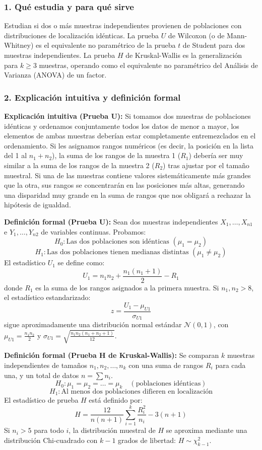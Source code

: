 \documentclass[11pt,a4paper]{article}
\begin{document}
\subsubsection{1. Qué estudia y para qué sirve}
Estudian si dos o más muestras independientes provienen de poblaciones con distribuciones de localización idénticas. La prueba $U$ de Wilcoxon (o de Mann-Whitney) es el equivalente no paramétrico de la prueba $t$ de Student para dos muestras independientes. La prueba $H$ de Kruskal-Wallis es la generalización para $k \ge 3$ muestras, operando como el equivalente no paramétrico del Análisis de Varianza (ANOVA) de un factor.

\subsubsection{2. Explicación intuitiva y definición formal}
\textbf{Explicación intuitiva (Prueba U):} Si tomamos dos muestras de poblaciones idénticas y ordenamos conjuntamente todos los datos de menor a mayor, los elementos de ambas muestras deberían estar completamente entremezclados en el ordenamiento. Si les asignamos rangos numéricos (es decir, la posición en la lista del 1 al $n_1+n_2$), la suma de los rangos de la muestra 1 ($R_1$) debería ser muy similar a la suma de los rangos de la muestra 2 ($R_2$) tras ajustar por el tamaño muestral. Si una de las muestras contiene valores sistemáticamente más grandes que la otra, sus rangos se concentrarán en las posiciones más altas, generando una disparidad muy grande en la suma de rangos que nos obligará a rechazar la hipótesis de igualdad.

\textbf{Definición formal (Prueba U):} Sean dos muestras independientes $X_1, \dots, X_{n1}$ e $Y_1, \dots, Y_{n2}$ de variables continuas. Probamos:
\[ H_0: \text{Las dos poblaciones son idénticas } (\mu_1 = \mu_2) \]
\[ H_1: \text{Las dos poblaciones tienen medianas distintas } (\mu_1 \neq \mu_2) \]
El estadístico $U_1$ se define como:
\[ U_1 = n_1 n_2 + \frac{n_1(n_1+1)}{2} - R_1 \]
donde $R_1$ es la suma de los rangos asignados a la primera muestra. Si $n_1, n_2 > 8$, el estadístico estandarizado:
\[ z = \frac{U_1 - \mu_{U1}}{\sigma_{U1}} \]
sigue aproximadamente una distribución normal estándar $\mathcal{N}(0,1)$, con $\mu_{U1} = \frac{n_1 n_2}{2}$ y $\sigma_{U1} = \sqrt{\frac{n_1 n_2(n_1 + n_2 + 1)}{12}}$.

\textbf{Definición formal (Prueba H de Kruskal-Wallis):} Se comparan $k$ muestras independientes de tamaños $n_1, n_2, \dots, n_k$ con una suma de rangos $R_i$ para cada una, y un total de datos $n = \sum n_i$.
\[ H_0: \mu_1 = \mu_2 = \dots = \mu_k \quad (\text{poblaciones idénticas}) \]
\[ H_1: \text{Al menos dos poblaciones difieren en localización} \]
El estadístico de prueba $H$ está definido por:
\[ H = \frac{12}{n(n+1)} \sum_{i=1}^{k} \frac{R_i^2}{n_i} - 3(n+1) \]
Si $n_i > 5$ para todo $i$, la distribución muestral de $H$ se aproxima mediante una distribución Chi-cuadrado con $k-1$ grados de libertad: $H \sim \chi^2_{k-1}$.
\end{document}
